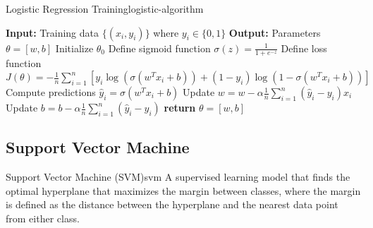 \documentclass[12pt]{article}
\begin{document}
\begin{algorithmenv}{Logistic Regression Training}{logistic-algorithm}
\begin{algorithmic}[1]
\State \textbf{Input:} Training data $\{(x_i, y_i)\}$ where $y_i \in \{0,1\}$
\State \textbf{Output:} Parameters $\theta = [w, b]$
\State Initialize $\theta_0$
\State Define sigmoid function $\sigma(z) = \frac{1}{1+e^{-z}}$
\State Define loss function $J(\theta) = -\frac{1}{n}\sum_{i=1}^n [y_i \log(\sigma(w^T x_i + b)) + (1-y_i)\log(1-\sigma(w^T x_i + b))]$
    \State Compute predictions $\hat{y}_i = \sigma(w^T x_i + b)$
    \State Update $w = w - \alpha \frac{1}{n}\sum_{i=1}^n (\hat{y}_i - y_i)x_i$
    \State Update $b = b - \alpha \frac{1}{n}\sum_{i=1}^n (\hat{y}_i - y_i)$
\EndWhile
\State \textbf{return} $\theta = [w, b]$
\end{algorithmic}
\end{algorithmenv}

\subsection{Support Vector Machine}

\begin{definition}{Support Vector Machine (SVM)}{svm}
A supervised learning model that finds the optimal hyperplane that maximizes the margin between classes, where the margin is defined as the distance between the hyperplane and the nearest data point from either class.
\end{definition}
\end{document}
